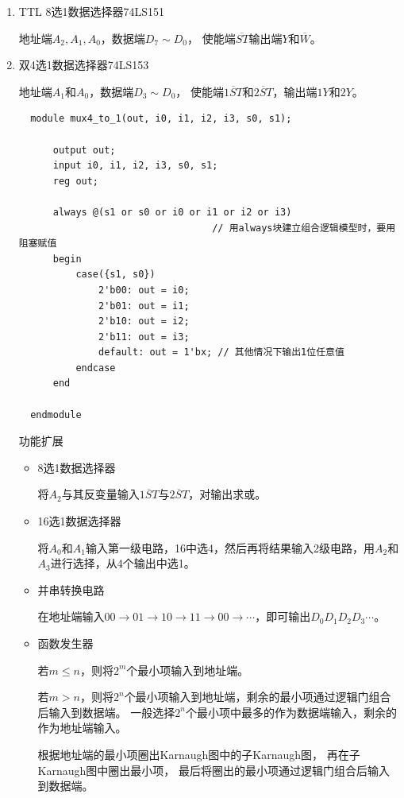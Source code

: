 \documentclass[UTF8,fontset=fandol,zihao=5]{ctexart}
\begin{document}
\begin{enumerate}
  \item TTL 8选1数据选择器74LS151
  
  地址端$A_2,A_1,A_0$，数据端$D_7\sim D_0$，
  使能端$\overline{ST}$输出端$Y$和$\overline{W}$。
  
  \item 双4选1数据选择器74LS153
  
  地址端$A_1$和$A_0$，数据端$D_3\sim D_0$，
  使能端$\overline{1ST}$和$\overline{2ST}$，输出端$1Y$和$2Y$。

  \begin{verbatim}
  module mux4_to_1(out, i0, i1, i2, i3, s0, s1);

      output out;
      input i0, i1, i2, i3, s0, s1;
      reg out;

      always @(s1 or s0 or i0 or i1 or i2 or i3)
                                  // 用always块建立组合逻辑模型时，要用阻塞赋值
      begin
          case({s1, s0})
              2'b00: out = i0;
              2'b01: out = i1;
              2'b10: out = i2;
              2'b11: out = i3;
              default: out = 1'bx; // 其他情况下输出1位任意值
          endcase
      end

  endmodule
  \end{verbatim}

  功能扩展

  \begin{itemize}
    \item 8选1数据选择器
    
    将$A_2$与其反变量输入$\overline{1ST}$与$\overline{2ST}$，对输出求或。

    \item 16选1数据选择器
    
    将$A_0$和$A_1$输入第一级电路，16中选4，然后再将结果输入2级电路，用$A_2$和$A_3$进行选择，从4个输出中选1。
  
    \item 并串转换电路
    
    在地址端输入$00\to01\to10\to11\to00\to\cdots$，即可输出$D_0D_1D_2D_3\cdots$。

    \item 函数发生器
    
    若$m\leq n$，则将$2^m$个最小项输入到地址端。

    若$m>n$，则将$2^n$个最小项输入到地址端，剩余的最小项通过逻辑门组合后输入到数据端。
    一般选择$2^n$个最小项中最多的作为数据端输入，剩余的作为地址端输入。

    \begin{methodbox}[Karnaugh图法]
      根据地址端的最小项圈出Karnaugh图中的子Karnaugh图，
      再在子Karnaugh图中圈出最小项，
      最后将圈出的最小项通过逻辑门组合后输入到数据端。
    \end{methodbox}
  \end{itemize}
\end{enumerate}
\end{document}

